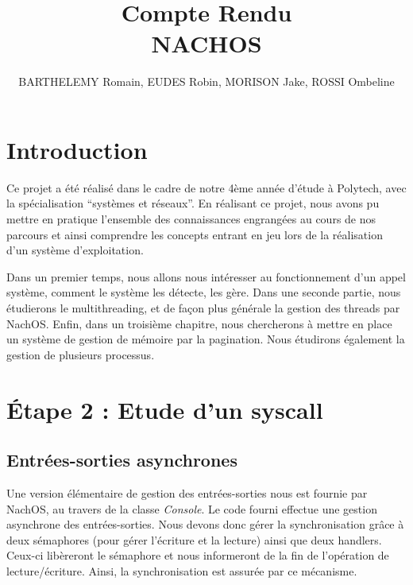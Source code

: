 \documentclass[a4paper,10pt]{article}
\title{Compte Rendu \\ NACHOS}
\author{BARTHELEMY Romain, EUDES Robin, MORISON Jake, ROSSI Ombeline}
\begin{document}
\maketitle
\tableofcontents
\newpage
\section{Introduction}
Ce projet a été réalisé dans le cadre de notre 4ème année d'étude à Polytech, avec la spécialisation ``systèmes et réseaux''.
En réalisant ce projet, nous avons pu mettre en pratique l'ensemble des connaissances engrangées au cours de nos parcours et ainsi
comprendre les concepts entrant en jeu lors de la réalisation d'un système d'exploitation.
\vspace{0.5cm}

Dans un premier temps, nous allons nous intéresser au fonctionnement d'un appel système, comment le système les détecte, les gère.
Dans une seconde partie, nous étudierons le multithreading, et de façon plus générale la gestion des threads par NachOS.
Enfin, dans un troisième chapitre, nous chercherons à mettre en place un système de gestion de mémoire par la pagination.
Nous étudirons également la gestion de plusieurs processus.


\newpage
\section{Étape 2 : Etude d'un syscall}
\subsection{Entrées-sorties asynchrones}
Une version élémentaire de gestion des entrées-sorties nous est fournie par NachOS, au travers de la classe \textit{Console}. Le code fourni
effectue une  gestion asynchrone des entrées-sorties. Nous devons donc gérer la synchronisation grâce à deux sémaphores (pour gérer l'écriture et la lecture)
ainsi que deux handlers. Ceux-ci libèreront le sémaphore et nous informeront de la fin de l'opération de lecture/écriture. Ainsi, la synchronisation est assurée
par ce mécanisme.
\end{document}

